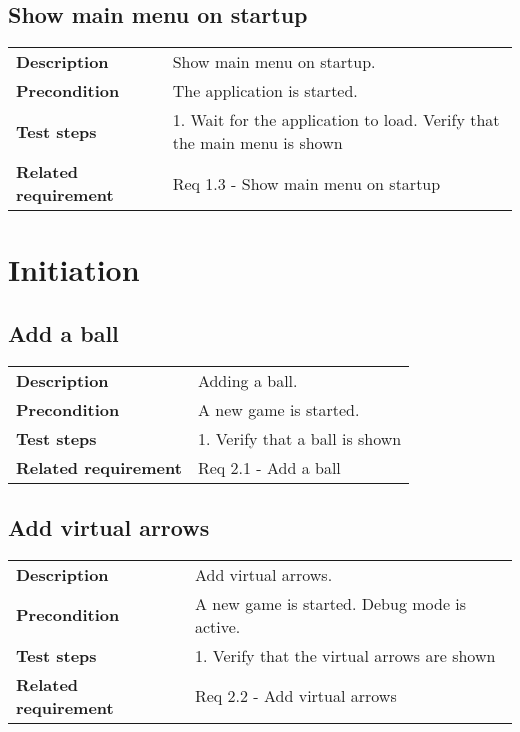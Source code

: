 \documentclass[a4paper,titlepage]{article}
\begin{document}
\subsection{Show main menu on startup}
\begin{tabularx}{\textwidth}{lX}
	\textbf{Description}	&
		Show main menu on startup.\\
	\textbf{Precondition}	&
		The application is started.\\
	\textbf{Test steps}	&
		1.  Wait for the application to load\newline
		2.  Verify that the main menu is shown\\
	\textbf{Related requirement}	&
		Req 1.3 - Show main menu on startup\\
\end{tabularx}

\newpage
\section{Initiation}
\subsection{Add a ball}
\begin{tabularx}{\textwidth}{lX}
	\textbf{Description}	&
		Adding a ball.\\
	\textbf{Precondition}	&
		A new game is started.\\
	\textbf{Test steps}	&
		1.  Verify that a ball is shown \\
	\textbf{Related requirement}	&
		Req 2.1 - Add a ball \\
\end{tabularx}

\subsection{Add virtual arrows}
\begin{tabularx}{\textwidth}{lX}
	\textbf{Description}	&
		Add virtual arrows.\\
	\textbf{Precondition}	&
		A new game is started.\newline
		Debug mode is active.\\
	\textbf{Test steps}	&
		1.  Verify that the virtual arrows are shown\\
	\textbf{Related requirement}	&
		Req 2.2 - Add virtual arrows \\
\end{tabularx}
\end{document}
